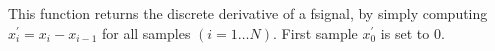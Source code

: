 This function returns the discrete derivative of a fsignal, by simply
computing $x^\prime_{i} = x_{i} - x_{i-1}$ for all samples $(i=1 \ldots N)$.
First sample $x^\prime_{0}$ is set to $0$.


